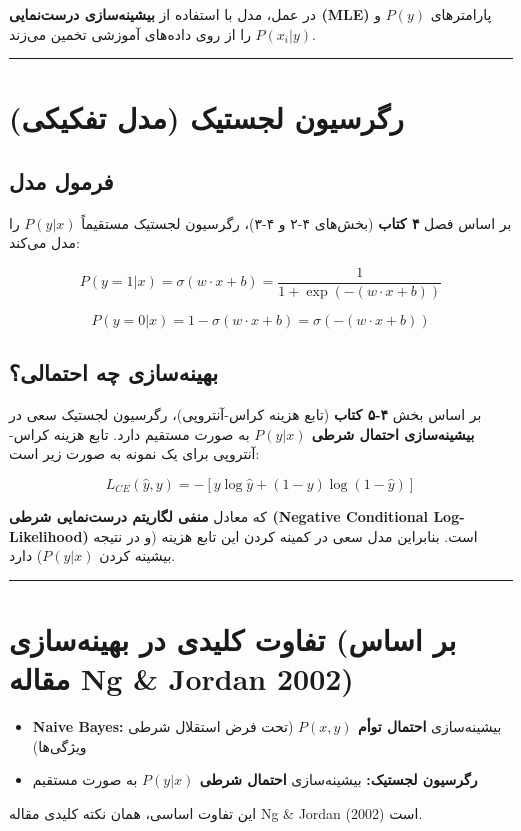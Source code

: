 \documentclass[11pt,a4paper]{article}
\newcommand{\en}[1]{\textenglish{#1}}
\newcommand{\separator}{\vspace{1em}\noindent\rule{\linewidth}{0.4pt}\vspace{1em}}
\begin{document}
در عمل، مدل با استفاده از \textbf{بیشینه‌سازی درست‌نمایی (\en{MLE})} پارامترهای \(P(y)\) و \(P(x_i|y)\) را از روی داده‌های آموزشی تخمین می‌زند.

\separator
\section{رگرسیون لجستیک (مدل تفکیکی)}

\subsection{فرمول مدل}
بر اساس فصل \textbf{۴ کتاب} (بخش‌های \en{۴-۲} و \en{۴-۳})، رگرسیون لجستیک مستقیماً \(P(y|x)\) را مدل می‌کند:

\[
P(y=1|x) = \sigma(w \cdot x + b) = \frac{1}{1 + \exp(-(w \cdot x + b))}
\]

\[
P(y=0|x) = 1 - \sigma(w \cdot x + b) = \sigma(-(w \cdot x + b))
\]

\subsection{بهینه‌سازی چه احتمالی؟}
بر اساس بخش \textbf{\en{۴-۵} کتاب} (تابع هزینه کراس-آنتروپی)، رگرسیون لجستیک سعی در \textbf{بیشینه‌سازی احتمال شرطی \(P(y|x)\)} به صورت مستقیم دارد. تابع هزینه کراس-آنتروپی برای یک نمونه به صورت زیر است:

\[
L_{CE}(\hat{y}, y) = -[y \log \hat{y} + (1-y) \log(1-\hat{y})]
\]

که معادل \textbf{منفی لگاریتم درست‌نمایی شرطی (\en{Negative Conditional Log-Likelihood})} است. بنابراین مدل سعی در کمینه کردن این تابع هزینه (و در نتیجه بیشینه کردن \(P(y|x)\)) دارد.

\separator
\section{تفاوت کلیدی در بهینه‌سازی (بر اساس مقاله \en{Ng \& Jordan 2002})}

\begin{itemize}
    \item \textbf{\en{Naive Bayes}:} بیشینه‌سازی \textbf{احتمال توأم \(P(x,y)\)} (تحت فرض استقلال شرطی ویژگی‌ها)
    \item \textbf{رگرسیون لجستیک:} بیشینه‌سازی \textbf{احتمال شرطی \(P(y|x)\)} به صورت مستقیم
\end{itemize}

این تفاوت اساسی، همان نکته کلیدی مقاله \en{Ng \& Jordan (2002)} است.
\end{document}
